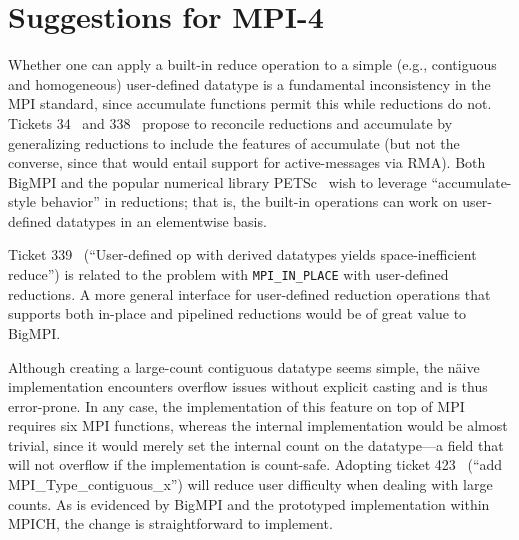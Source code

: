 
\section{Suggestions for MPI-4}
\label{sec:mpi4}


Whether one can apply a built-in reduce operation to a simple 
(e.g., contiguous and homogeneous) user-defined datatype
is a fundamental inconsistency in the MPI standard, since accumulate
functions permit this while reductions do not.
Tickets 34~\cite{ticket34} and 338~\cite{ticket338}
propose to reconcile reductions and accumulate by generalizing
reductions to include the features of accumulate
(but not the converse, since that would entail support for active-messages via RMA).
Both BigMPI and the popular numerical library 
PETSc~\cite{petsc-web-page,petsc-user-ref,petsc-efficient}
wish to leverage 
``accumulate-style behavior'' in reductions; that is,  the built-in operations 
can work on user-defined datatypes in an elementwise basis.

Ticket 339~\cite{ticket339} %
(``User-defined op with derived datatypes yields space-inefficient reduce'')
is related to the problem with \texttt{MPI\_IN\_PLACE} with user-defined reductions.
A more general interface for user-defined reduction operations that supports both
in-place and pipelined reductions would be of great value to BigMPI.

Although creating a large-count contiguous datatype seems simple,
the n{\"a}ive implementation encounters overflow issues without explicit casting and is
thus error-prone.  In any case, the implementation of this feature on top of MPI
requires six MPI functions, whereas the internal implementation would be almost trivial,
since it would merely set the internal count on the datatype---a field that will not overflow 
if the implementation is count-safe.
Adopting ticket 423~\cite{ticket423} %
(``add MPI\_Type\_contiguous\_x'') will reduce user difficulty when dealing with large counts.
As is evidenced by BigMPI and the prototyped implementation within MPICH, 
the change is straightforward to implement.

